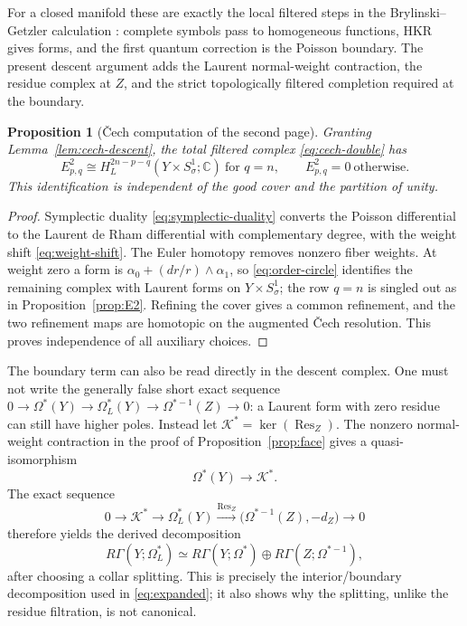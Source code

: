 \documentclass[11pt,oneside,reqno]{article}
\newcommand{\C}{\mathbb C}
\theoremstyle{plain}
\newtheorem{proposition}[theorem]{Proposition}
\theoremstyle{definition}
\theoremstyle{remark}
\begin{document}
For a closed manifold these are exactly the local filtered steps in the
Brylinski--Getzler calculation \cite{BG}: complete symbols pass to
homogeneous functions, HKR gives forms, and the first quantum correction is
the Poisson boundary.  The present descent argument adds the Laurent
normal-weight contraction, the residue complex at \(Z\), and the strict
topologically filtered completion required at the boundary.

\begin{proposition}[\v Cech computation of the second page]
Granting Lemma~\ref{lem:cech-descent}, the total filtered complex
\eqref{eq:cech-double} has
\[
 E^2_{p,q}\cong H_L^{2n-p-q}(Y\times S^1_\sigma;\C)\ \text{for }q=n,
 \qquad E^2_{p,q}=0\ \text{otherwise}.
\]
This identification is independent of the good cover and the partition of
unity.
\end{proposition}

\begin{proof}
Symplectic duality \eqref{eq:symplectic-duality} converts the Poisson
differential to the Laurent de Rham differential with complementary degree,
with the weight shift \eqref{eq:weight-shift}. The Euler homotopy removes
nonzero fiber weights.  At weight zero a form is
\(\alpha_0+(dr/r)\wedge\alpha_1\), so
\eqref{eq:order-circle} identifies the remaining complex with Laurent forms
on \(Y\times S^1_\sigma\); the row \(q=n\) is singled out as in
Proposition~\ref{prop:E2}.  Refining the cover gives a common refinement, and
the two refinement maps are homotopic on the augmented \v Cech resolution.
This proves independence of all auxiliary choices.
\end{proof}

The boundary term can also be read directly in the descent complex.  One
must not write the generally false short exact sequence
\(0\to\Omega^*(Y)\to\Omega_L^*(Y)\to\Omega^{*-1}(Z)\to0\): a Laurent form
with zero residue can still have higher poles.  Instead let
\(\mathcal K^*=\ker(\operatorname{Res}_Z)\).  The nonzero normal-weight
contraction in the proof of Proposition~\ref{prop:face} gives a
quasi-isomorphism
\[
 \Omega^*(Y)\longrightarrow\mathcal K^*.
\]
The exact sequence
\[
0\longrightarrow\mathcal K^*
 \longrightarrow\Omega_L^*(Y)
 \xrightarrow{\operatorname{Res}_Z}
 \bigl(\Omega^{*-1}(Z),-d_Z\bigr)\longrightarrow0
\]
therefore yields the derived decomposition
\begin{equation}\label{eq:cech-residue-derived}
 R\Gamma(Y;\Omega_L^*)
 \simeq R\Gamma(Y;\Omega^*)
 \oplus R\Gamma(Z;\Omega^{*-1}),
\end{equation}
after choosing a collar splitting.  This is precisely the interior/boundary
decomposition used in \eqref{eq:expanded}; it also shows why the splitting,
unlike the residue filtration, is not canonical.
\end{document}
